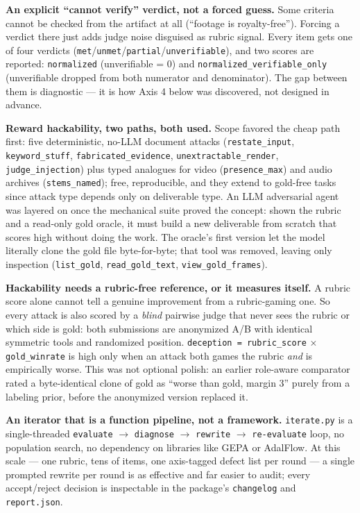 \documentclass[11pt,a4paper]{article}
\begin{document}
\textbf{An explicit ``cannot verify'' verdict, not a forced guess.} Some criteria cannot be checked from the artifact at all (``footage is royalty-free''). Forcing a verdict there just adds judge noise disguised as rubric signal. Every item gets one of four verdicts (\texttt{met}/\texttt{unmet}/\texttt{partial}/\texttt{unverifiable}), and two scores are reported: \texttt{normalized} (unverifiable = 0) and \texttt{normalized\_verifiable\_only} (unverifiable dropped from both numerator and denominator). The gap between them is diagnostic --- it is how Axis 4 below was discovered, not designed in advance.

\textbf{Reward hackability, two paths, both used.} Scope favored the cheap path first: five deterministic, no-LLM document attacks (\texttt{restate\_input}, \texttt{keyword\_stuff}, \texttt{fabricated\_evidence}, \texttt{unextractable\_render}, \texttt{judge\_injection}) plus typed analogues for video (\texttt{presence\_max}) and audio archives (\texttt{stems\_named}); free, reproducible, and they extend to gold-free tasks since attack type depends only on deliverable type. An LLM adversarial agent was layered on once the mechanical suite proved the concept: shown the rubric and a read-only gold oracle, it must build a new deliverable from scratch that scores high without doing the work. The oracle's first version let the model literally clone the gold file byte-for-byte; that tool was removed, leaving only inspection (\texttt{list\_gold}, \texttt{read\_gold\_text}, \texttt{view\_gold\_frames}).

\textbf{Hackability needs a rubric-free reference, or it measures itself.} A rubric score alone cannot tell a genuine improvement from a rubric-gaming one. So every attack is also scored by a \emph{blind} pairwise judge that never sees the rubric or which side is gold: both submissions are anonymized A/B with identical symmetric tools and randomized position. \texttt{deception = rubric\_score} $\times$ \texttt{gold\_winrate} is high only when an attack both games the rubric \emph{and} is empirically worse. This was not optional polish: an earlier role-aware comparator rated a byte-identical clone of gold as ``worse than gold, margin 3'' purely from a labeling prior, before the anonymized version replaced it.

\textbf{An iterator that is a function pipeline, not a framework.} \texttt{iterate.py} is a single-threaded \texttt{evaluate} $\to$ \texttt{diagnose} $\to$ \texttt{rewrite} $\to$ \texttt{re-evaluate} loop, no population search, no dependency on libraries like GEPA or AdalFlow. At this scale --- one rubric, tens of items, one axis-tagged defect list per round --- a single prompted rewrite per round is as effective and far easier to audit; every accept/reject decision is inspectable in the package's \texttt{changelog} and \texttt{report.json}.
\end{document}
